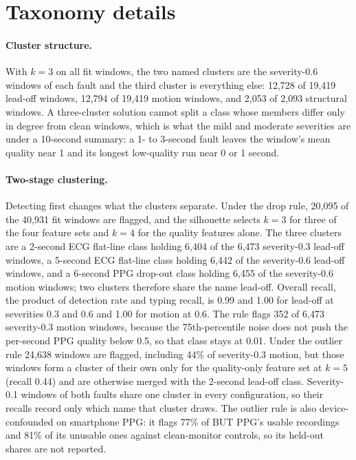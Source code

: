 \documentclass[pmlr,twocolumn,10pt]{jmlr}
\begin{document}
\section{Taxonomy details}
\label{apx:taxonomy}

\paragraph{Cluster structure.}
With $k=3$ on all fit windows, the two named clusters are the severity-0.6 windows of each fault and the third cluster is everything else: 12,728 of 19,419 lead-off windows, 12,794 of 19,419 motion windows, and 2,053 of 2,093 structural windows. A three-cluster solution cannot split a class whose members differ only in degree from clean windows, which is what the mild and moderate severities are under a 10-second summary: a 1- to 3-second fault leaves the window's mean quality near 1 and its longest low-quality run near 0 or 1 second.

\paragraph{Two-stage clustering.}
Detecting first changes what the clusters separate. Under the drop rule, 20,095 of the 40,931 fit windows are flagged, and the silhouette selects $k=3$ for three of the four feature sets and $k=4$ for the quality features alone. The three clusters are a 2-second ECG flat-line class holding 6,404 of the 6,473 severity-0.3 lead-off windows, a 5-second ECG flat-line class holding 6,442 of the severity-0.6 lead-off windows, and a 6-second PPG drop-out class holding 6,455 of the severity-0.6 motion windows; two clusters therefore share the name lead-off. Overall recall, the product of detection rate and typing recall, is 0.99 and 1.00 for lead-off at severities 0.3 and 0.6 and 1.00 for motion at 0.6. The rule flags 352 of 6,473 severity-0.3 motion windows, because the 75th-percentile noise does not push the per-second PPG quality below 0.5, so that class stays at 0.01. Under the outlier rule 24,638 windows are flagged, including 44\% of severity-0.3 motion, but those windows form a cluster of their own only for the quality-only feature set at $k=5$ (recall 0.44) and are otherwise merged with the 2-second lead-off class. Severity-0.1 windows of both faults share one cluster in every configuration, so their recalls record only which name that cluster draws. The outlier rule is also device-confounded on smartphone PPG: it flags 77\% of BUT PPG's usable recordings and 81\% of its unusable ones against clean-monitor controls, so its held-out shares are not reported.
\end{document}
